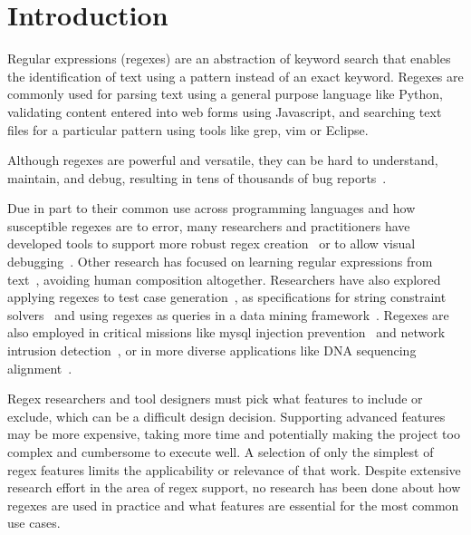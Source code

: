 \section{Introduction }

Regular expressions (regexes) are an abstraction of keyword search that enables the identification of text using a pattern instead of an exact keyword.
Regexes are commonly used for parsing text using a general purpose language like Python, validating content entered into web forms using Javascript, and searching text files for a particular pattern using tools like grep, vim or Eclipse.

Although regexes are powerful and versatile, they can be hard to understand,  maintain, and debug, resulting in tens of thousands of bug reports~\cite{Spishak:2012:TSR:2318202.2318207}.

Due in part to their common use across programming languages and how susceptible regexes are to error, many researchers and practitioners have developed tools to support more robust regex creation~\cite{Spishak:2012:TSR:2318202.2318207} or to allow visual debugging~\cite{Beck:2014:RVD:2591062.2591111}. Other research has focused on learning regular expressions from  text~\cite{Babbar:2010:CBA:1871840.1871848, Li:2008:REL:1613715.1613719}, avoiding human composition altogether.
Researchers have also explored applying regexes to test case generation~\cite{Ghosh:2013:JAT:2486788.2486925, Galler:2014:STD:2683035.2683100, Anand:2013:OSM:2503903.2503991, Tillmann:2014:TAT:2642937.2642941},
as specifications for string constraint solvers~\cite{Trinh:2014:SSS:2660267.2660372, hampi} and using regexes as queries in a data mining framework~\cite{Begel:2010:CDE:1806799.1806821}.
Regexes are also employed in critical missions like mysql injection prevention~\cite{Yeole:2011:ADT:1980022.1980229} and network intrusion detection~\cite{network}, or in more diverse applications like DNA sequencing alignment~\cite{1594922}. 

Regex researchers and tool designers must pick what features to include or exclude, which  can be a difficult  design decision. Supporting advanced features may be more expensive, taking more time and potentially making the project too complex and cumbersome to execute well.  A selection of only the simplest of regex features limits the applicability or relevance of that work. Despite extensive research effort in the area of regex support,  no research has been done about how regexes are used in practice and what features are essential for the most common use cases.


